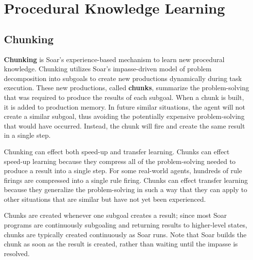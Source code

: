 \chapter{Procedural Knowledge Learning}
\label{CHUNKING}

\section{Chunking}

\textbf{Chunking} is Soar's experience-based mechanism to learn new procedural knowledge.  Chunking utilizes Soar's impasse-driven model of problem decomposition into subgoals to create new productions dynamically during task execution.  These new productions, called \textbf{chunks}, summarize the problem-solving that was required to produce the results of each subgoal. When a chunk is built, it is added to production memory.  In future similar situations, the agent will not create a similar subgoal, thus avoiding the potentially expensive problem-solving that would have occurred.  Instead, the chunk will fire and create the same result in a single step.  

Chunking can effect both speed-up and transfer learning.  Chunks can effect speed-up learning because they compress all of the problem-solving needed to produce a result into a single step.  For some real-world agents, hundreds of rule firings are compressed into a single rule firing.  Chunks can effect transfer learning because they generalize the problem-solving in such a way that they can apply to other situations that are similar but have not yet been experienced.

Chunks are created whenever one subgoal creates a result; since most Soar programs are continuously subgoaling and returning results to higher-level states, chunks are typically created continuously as Soar runs.  Note that Soar builds the chunk as soon as the result is created, rather than waiting until the impasse is resolved.


